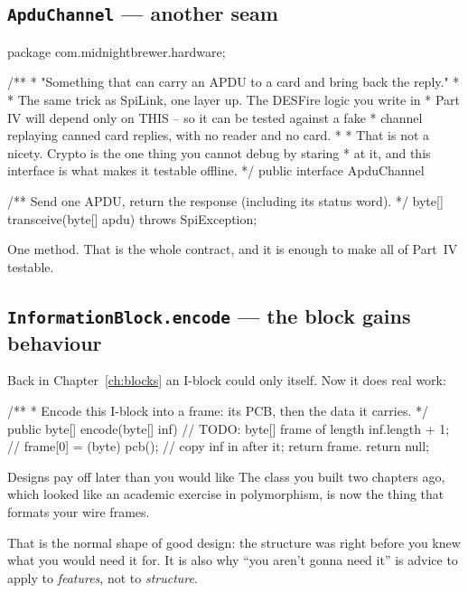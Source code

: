 \subsection{\texttt{ApduChannel} --- another seam}

\begin{jcode}
package com.midnightbrewer.hardware;

/**
 * "Something that can carry an APDU to a card and bring back the reply."
 *
 * The same trick as SpiLink, one layer up. The DESFire logic you write in
 * Part IV will depend only on THIS -- so it can be tested against a fake
 * channel replaying canned card replies, with no reader and no card.
 *
 * That is not a nicety. Crypto is the one thing you cannot debug by staring
 * at it, and this interface is what makes it testable offline.
 */
public interface ApduChannel {

    /** Send one APDU, return the response (including its status word). */
    byte[] transceive(byte[] apdu) throws SpiException;
}
\end{jcode}

One method. That is the whole contract, and it is enough to make all of Part~IV
testable.

\subsection{\texttt{InformationBlock.encode} --- the block gains behaviour}

Back in Chapter~\ref{ch:blocks} an I-block could only  itself.
Now it does real work:

\begin{jcode}
    /**
     * Encode this I-block into a frame: its PCB, then the data it carries.
     */
    public byte[] encode(byte[] inf) {
        // TODO: byte[] frame of length inf.length + 1;
        //       frame[0] = (byte) pcb();
        //       copy inf in after it; return frame.
        return null;
    }
\end{jcode}

\begin{deeper}{Designs pay off later than you would like}
The class you built two chapters ago, which looked like an academic exercise in
polymorphism, is now the thing that formats your wire frames.

That is the normal shape of good design: the structure was right before you knew
what you would need it for. It is also why ``you aren't gonna need it'' is
advice to apply to \emph{features}, not to \emph{structure}.
\end{deeper}

